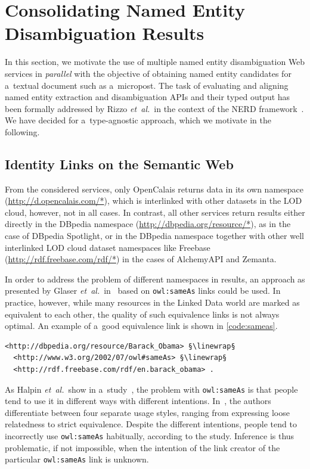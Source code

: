\section{Consolidating Named Entity Disambiguation Results} 
\label{sec:consolidate}

In this section, we motivate the use of multiple
named entity disambiguation Web services in \emph{parallel}
with the objective of obtaining named entity candidates
for a~textual document such as a~micropost.
The task of evaluating and aligning named entity extraction and
disambiguation APIs and their typed output
has been formally addressed by Rizzo \emph{et~al.}\ in
the context of the NERD
framework~\cite{rizzo2011nerd,rizzo2012nerd}.
We have decided for a~type-agnostic approach,
which we motivate in the following.

\subsection{Identity Links on the Semantic Web}
\label{sec:sameasorg}

From the considered services, only OpenCalais returns data in its
own namespace (\url{http://d.opencalais.com/*}), which is
interlinked with other datasets in the LOD cloud,
however, not in all cases.
In contrast, all other services return results either directly
in the DBpedia namespace (\url{http://dbpedia.org/resource/*}),
as in the case of DBpedia Spotlight,
or in the DBpedia namespace together with other
well interlinked LOD cloud dataset namespaces like Freebase
(\url{http://rdf.freebase.com/rdf/*}) in the cases of
AlchemyAPI and Zemanta.

In order to address the problem of different namespaces in results,
an approach as presented by Glaser \emph{et~al.}\ 
in~\cite{glaser2009sameas} based on \texttt{owl:sameAs} links
could be used.
In practice, however, while many resources in the Linked Data
world are marked as equivalent to each other,
the quality of such equivalence links is not always optimal.
An example of a~good equivalence link is shown in \autoref{code:sameas}.

\begin{lstlisting}[caption={Example of a~good equivalence link},
  label={code:sameas},
  escapechar=§]
<http://dbpedia.org/resource/Barack_Obama> §\linewrap§
  <http://www.w3.org/2002/07/owl#sameAs> §\linewrap§
  <http://rdf.freebase.com/rdf/en.barack_obama> .
\end{lstlisting}

\noindent As Halpin \emph{et~al.}\ show
in a~study~\cite{halpin2010owlsameas}, the problem
with \texttt{owl:sameAs} is that people tend to use it
in different ways with different intentions.
In~\cite{halpin2010owlsameas},
the authors differentiate between four separate usage styles,
ranging from expressing loose relatedness
to strict equivalence.
Despite the different intentions, people tend to incorrectly use
\texttt{owl:sameAs} habitually, according to the study.
Inference is thus problematic, if not impossible,
when the intention of the link creator of the particular
\texttt{owl:sameAs} link is unknown.


